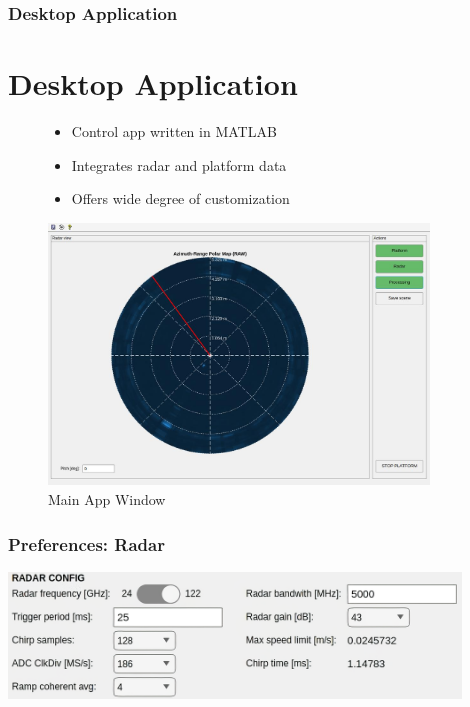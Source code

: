 \documentclass[aspectratio=169]{beamer}
\begin{document}
\begin{frame}[fragile]
  \frametitle{Desktop Application}
  \section{Desktop Application}
  \begin{figure}[!htb]
    \begin{minipage}{0.48\textwidth}
  \begin{itemize}
    \item Control app written in MATLAB
    \item Integrates radar and platform data
    \item Offers wide degree of customization
  \end{itemize}
    \end{minipage}\hfill
    \begin{minipage}{0.48\textwidth}
      \centering
    \includegraphics[width=0.9\textwidth]{../img/vis_range_azimuth.jpg}
    \caption[]{Main App Window}
    \end{minipage}
  \end{figure}
\end{frame}

\begin{frame}[fragile]
  \frametitle{Preferences: Radar}
  \begin{center}
    \includegraphics[width=0.9\textwidth]{../img/preferences_crop1.png}
  \end{center}
\end{frame}
\end{document}
